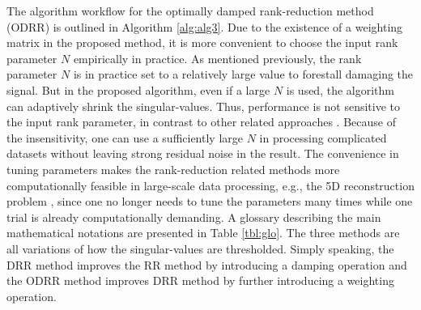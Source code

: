 {\begin{equation}
\end{equation}
The algorithm workflow for the optimally damped rank-reduction method (ODRR) is outlined in Algorithm \ref{alg:alg3}. Due to the existence of a weighting matrix in the proposed method, it is more convenient to choose the input rank parameter $N$ empirically in practice. As mentioned previously, the rank parameter $N$ is in practice set to a relatively large value to forestall damaging the signal. But in the proposed algorithm, even if a large $N$ is used, the algorithm can adaptively shrink the singular-values. Thus,  performance is not sensitive to the input rank parameter, in contrast to other related approaches \cite[]{mssa}. Because of the insensitivity, one can use a sufficiently large $N$ in processing complicated datasets without leaving strong residual noise in the result. The convenience in tuning parameters makes the rank-reduction related methods more computationally feasible in large-scale data processing, e.g., the 5D reconstruction problem \cite[]{yangkang2019gji5d}, since one no longer needs to tune the parameters many times while one trial is already computationally demanding.  A glossary describing the main mathematical notations are presented in Table \ref{tbl:glo}. The three methods are all variations of how the singular-values are thresholded. Simply speaking, the DRR method improves the RR method by introducing a damping operation and the ODRR method improves DRR method by further introducing a weighting operation.}

